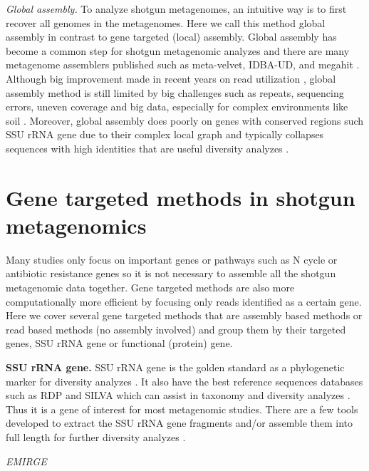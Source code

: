 \documentclass[]{msu-thesis}
\begin{document}
\textit{Global assembly. } To analyze shotgun metagenomes, an
intuitive way is to first recover all genomes in the metagenomes. Here
we call this method global assembly in contrast to gene targeted
(local) assembly. Global assembly has become a common step for shotgun
metagenomic analyzes and there are many metagenome assemblers
published such as meta-velvet, IDBA-UD, and megahit
\cite{li_megahit:_2015,namiki_metavelvet:_2012,peng_idba-ud:_2012}.
Although big improvement made in recent years on read utilization
\cite{li_megahit:_2015}, global assembly method is still limited by
big challenges such as repeats, sequencing errors, uneven coverage and
big data, especially for complex environments like soil
\cite{howe_tackling_2014}. Moreover, global assembly does poorly on
genes with conserved regions such SSU rRNA gene due to their complex
local graph and typically collapses sequences with high identities
that are useful diversity analyzes
\cite{guo_microbial_2015,miller_emirge:_2011}.

\section{Gene targeted methods in shotgun metagenomics}

Many studies only focus on important genes or pathways such as N cycle
or antibiotic resistance genes so it is not necessary to assemble all
the shotgun metagenomic data together. Gene targeted methods are also
more computationally more efficient by focusing only reads identified
as a certain gene. Here we cover several gene targeted methods that
are assembly based methods or read based methods (no assembly
involved) and group them by their targeted genes, SSU rRNA gene or
functional (protein) gene.

\textbf{SSU rRNA gene. } SSU rRNA gene is the golden standard as a
phylogenetic marker for diversity analyzes
\cite{lane_rapid_1985,huse_exploring_2008}. It also have the best
reference sequences databases such as RDP and SILVA which can assist
in taxonomy and diversity analyzes
\cite{cole_ribosomal_2014,quast_silva_2013}. Thus it is a gene of
interest for most metagenomic studies. There are a few tools developed
to extract the SSU rRNA gene fragments and/or assemble them into full
length for further diversity analyzes
\cite{miller_emirge:_2011,yuan_reconstructing_2015,guo_microbial_2015}.


\textit{EMIRGE}
\end{document}
